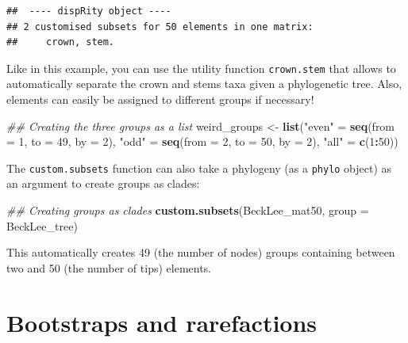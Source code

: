 \documentclass[
]{book}
\newenvironment{Shaded}{\begin{snugshade}}{\end{snugshade}}
\newcommand{\CommentTok}[1]{\textcolor[rgb]{0.56,0.35,0.01}{\textit{#1}}}
\newcommand{\DataTypeTok}[1]{\textcolor[rgb]{0.13,0.29,0.53}{#1}}
\newcommand{\DecValTok}[1]{\textcolor[rgb]{0.00,0.00,0.81}{#1}}
\newcommand{\KeywordTok}[1]{\textcolor[rgb]{0.13,0.29,0.53}{\textbf{#1}}}
\newcommand{\NormalTok}[1]{#1}
\newcommand{\OperatorTok}[1]{\textcolor[rgb]{0.81,0.36,0.00}{\textbf{#1}}}
\newcommand{\StringTok}[1]{\textcolor[rgb]{0.31,0.60,0.02}{#1}}
\begin{document}
\begin{verbatim}
##  ---- dispRity object ---- 
## 2 customised subsets for 50 elements in one matrix:
##     crown, stem.
\end{verbatim}

Like in this example, you can use the utility function \texttt{crown.stem} that allows to automatically separate the crown and stems taxa given a phylogenetic tree.
Also, elements can easily be assigned to different groups if necessary!

\begin{Shaded}
\begin{Highlighting}[]
\CommentTok{\#\# Creating the three groups as a list}
\NormalTok{weird\_groups \textless{}{-}}\StringTok{ }\KeywordTok{list}\NormalTok{(}\StringTok{"even"}\NormalTok{ =}\StringTok{ }\KeywordTok{seq}\NormalTok{(}\DataTypeTok{from =} \DecValTok{1}\NormalTok{, }\DataTypeTok{to =} \DecValTok{49}\NormalTok{, }\DataTypeTok{by =} \DecValTok{2}\NormalTok{),}
                      \StringTok{"odd"}\NormalTok{ =}\StringTok{ }\KeywordTok{seq}\NormalTok{(}\DataTypeTok{from =} \DecValTok{2}\NormalTok{, }\DataTypeTok{to =} \DecValTok{50}\NormalTok{, }\DataTypeTok{by =} \DecValTok{2}\NormalTok{),}
                      \StringTok{"all"}\NormalTok{ =}\StringTok{ }\KeywordTok{c}\NormalTok{(}\DecValTok{1}\OperatorTok{:}\DecValTok{50}\NormalTok{))}
\end{Highlighting}
\end{Shaded}

The \texttt{custom.subsets} function can also take a phylogeny (as a \texttt{phylo} object) as an argument to create groups as clades:

\begin{Shaded}
\begin{Highlighting}[]
\CommentTok{\#\# Creating groups as clades}
\KeywordTok{custom.subsets}\NormalTok{(BeckLee\_mat50, }\DataTypeTok{group =}\NormalTok{ BeckLee\_tree)}
\end{Highlighting}
\end{Shaded}

This automatically creates 49 (the number of nodes) groups containing between two and 50 (the number of tips) elements.

\hypertarget{bootstraps-and-rarefactions}{%
\section{Bootstraps and rarefactions}\label{bootstraps-and-rarefactions}}
\end{document}
